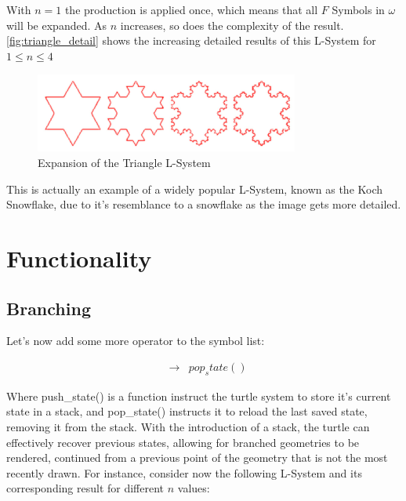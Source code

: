 \documentclass{acmtog}
\begin{document}
With $n=1$ the production is applied once, which means that all $F$ Symbols in $\omega$ will be expanded. As $n$ increases, so does the complexity of the result. \autoref{fig:triangle_detail} shows the increasing detailed results of this L-System for $1 \leq n \leq 4$

\begin{figure}[!htp]
  \begin{center}
    \includegraphics{images/2_triangle_detail}
    \caption{Expansion of the Triangle L-System \label{fig:triangle_detail}}
    \end{center}
\end{figure}

This is actually an example of a widely popular L-System, known as the Koch Snowflake, due to it's resemblance to a snowflake as the image gets more detailed.

\section{Functionality}
\label{sec:functionality}

\subsection{Branching}
\label{subsec:branching}

Let's now add some more operator to the symbol list:

\begin{eqnarray*}
    [ & \rightarrow &  push_state() \\
    ] & \rightarrow &  pop_state() 
\end{eqnarray*}

Where push\_state() is a function instruct the turtle system to store it's current state in a stack, and pop\_state() instructs it to reload the last saved state, removing it from the stack. With the introduction of a stack, the turtle can effectively recover previous states, allowing for branched geometries to be rendered, continued from a previous point of the geometry that is not the most recently drawn. For instance, consider now the following L-System and its corresponding result for different $n$ values:
\end{document}
